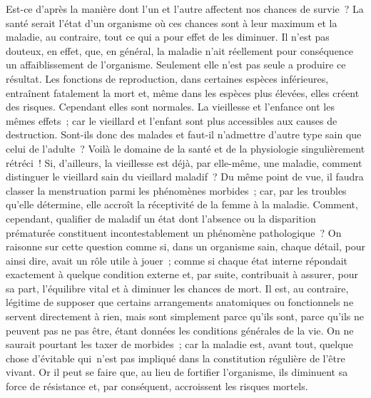 \documentclass[french,twoside]{book} %
\begin{document}
Est-ce d’après la manière dont l’un et l’autre affectent nos chances de survie ? La santé serait l’état d’un organisme où ces chances sont à leur maximum et la maladie, au contraire, tout ce qui a pour effet de les diminuer. Il n’est pas douteux, en effet, que, en général, la maladie n’ait réellement pour conséquence un affaiblissement de l’organisme. Seulement elle n’est pas seule a produire ce résultat. Les fonctions de reproduction, dans certaines espèces inférieures, entraînent fatalement la mort et, même dans les espèces plus élevées, elles créent des risques. Cependant elles sont normales. La vieillesse et l’enfance ont les mêmes effets ; car le vieillard et l’enfant sont plus accessibles aux causes de destruction. Sont-ils donc des malades et faut-il n’admettre d’autre type sain que celui de l’adulte ? Voilà le domaine de la santé et de la physiologie singulièrement rétréci ! Si, d’ailleurs, la vieillesse est déjà, par elle-même, une maladie, comment distinguer le vieillard sain du vieillard maladif ? Du même point de vue, il faudra classer la menstruation parmi les phénomènes morbides ; car, par les troubles qu’elle détermine, elle accroît la réceptivité de la femme à la maladie. Comment, cependant, qualifier de maladif un état dont l’absence ou la disparition prématurée constituent incontestablement un phénomène pathologique ? On raisonne sur cette question comme si, dans un organisme sain, chaque détail, pour ainsi dire, avait un rôle utile à jouer ; comme si chaque état interne répondait exactement à quelque condition externe et, par suite, contribuait à assurer, pour sa part, l’équilibre vital et à diminuer les chances de mort. Il est, au contraire, légitime de supposer que certains arrangements anatomiques ou fonctionnels ne servent directement à rien, mais sont simplement parce qu’ils sont, parce qu’ils ne peuvent pas ne pas être, étant données les conditions générales de la vie. On ne saurait pourtant les taxer de morbides ; car la maladie est, avant tout, quelque chose d’évitable qui n’est pas impliqué dans la constitution régulière de l’être vivant. Or il peut se faire que, au lieu de fortifier l’organisme, ils diminuent sa force de résistance et, par conséquent, accroissent les risques mortels.\par
\end{document}
